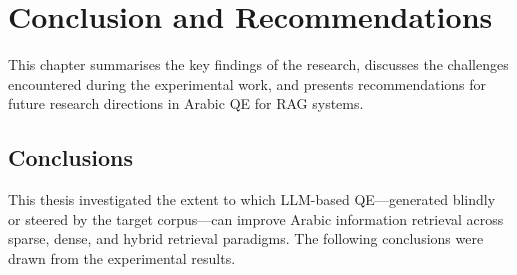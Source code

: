 \chapter{Conclusion and Recommendations}
\label{chap:conclusion}

This chapter summarises the key findings of the research, discusses the challenges encountered during the experimental work, and presents recommendations for future research directions in Arabic QE for RAG systems.

\section{Conclusions}
\label{sec:conclusions}

This thesis investigated the extent to which LLM-based QE---generated blindly or steered by the target corpus---can improve Arabic information retrieval across sparse, dense, and hybrid retrieval paradigms. The following conclusions were drawn from the experimental results.

